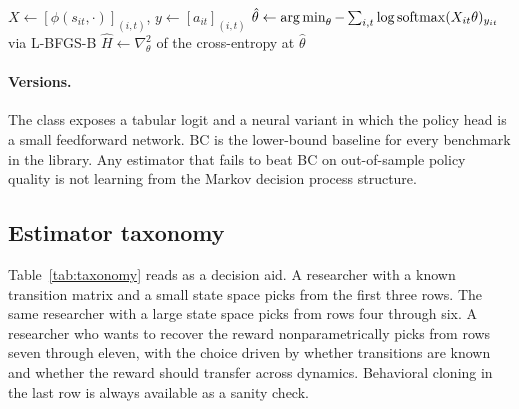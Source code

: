 \begin{algorithm}[H]
\SetAlgoLined
$X \leftarrow [\phi(s_{it}, \cdot)]_{(i,t)}$, $y \leftarrow [a_{it}]_{(i,t)}$\;
$\hat\theta \leftarrow \operatorname*{arg\,min}_\theta -\sum_{i,t} \log \mathrm{softmax}(X_{it} \theta)_{y_{it}}$ via L-BFGS-B\;
$\hat H \leftarrow \nabla^2_\theta$ of the cross-entropy at $\hat\theta$\;
\caption{Behavioral cloning}
\end{algorithm}

\paragraph{Versions.} The  class exposes a tabular logit and a neural variant in which the policy head is a small feedforward network. BC is the lower-bound baseline for every benchmark in the library. Any estimator that fails to beat BC on out-of-sample policy quality is not learning from the Markov decision process structure.

\subsection{Estimator taxonomy}

Table~\ref{tab:taxonomy} reads as a decision aid. A researcher with a known transition matrix and a small state space picks from the first three rows. The same researcher with a large state space picks from rows four through six. A researcher who wants to recover the reward nonparametrically picks from rows seven through eleven, with the choice driven by whether transitions are known and whether the reward should transfer across dynamics. Behavioral cloning in the last row is always available as a sanity check.

